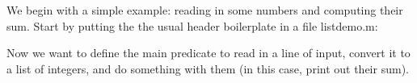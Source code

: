 \documentclass[a4paper,11pt,notitlepage,onecolumn]{book}
\begin{document}
We begin with a simple example: reading in some numbers and computing
their sum.
Start by putting the the usual header boilerplate in a file
\textsf{listdemo.m}:
\begin{small}

\begin{ptabular}
\nextline
{}
\nextline
{}
\nextline
\nextline
{}
\nextline
\nextline
{}
\nextline
{}
\nextline
\end{ptabular}

\end{small}
Now we want to define the \textsf{main} predicate to read in a line of input,
convert it to a list of integers, and do something with them (in this case,
print out their sum).
\end{document}
